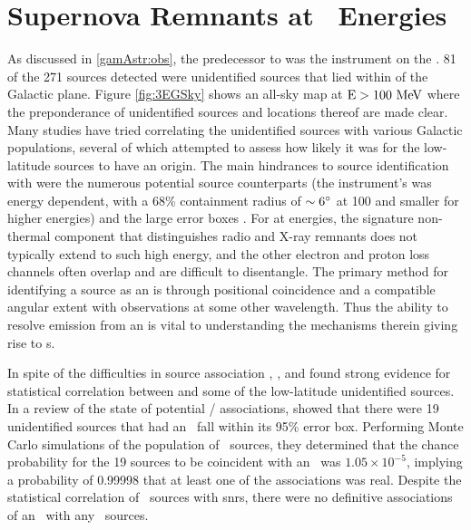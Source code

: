\section{\label{Rems:latGam}Supernova Remnants at \gam~Energies}
As discussed in \ref{gamAstr:obs}, the predecessor to \FermiLat{} was the \egret{} instrument on the \cgro{}. 81 of the 271 \egret{} sources detected were unidentified sources that lied within \blat {} of the Galactic plane.  Figure \ref{fig:3EGSky} shows an \egret{} all-sky map at ${\rm E > 100 ~\mathrm{MeV}}$ where the preponderance of unidentified sources and locations thereof are made clear. Many studies have tried correlating the unidentified \egret{} sources with various Galactic populations, several of which attempted to assess how likely it was for the low-latitude sources to have an \snr{} origin. The main hindrances to source identification with \egret{} were the numerous potential source counterparts (the instrument's \psf{} was energy dependent, with a 68\% containment radius of ${\rm \sim 6 ^\circ}$ at 100\mev{} and smaller for higher energies) and the large \egret{} error boxes \citep{Hartman99}. For \snrs{} at \gam{} energies, the signature non-thermal \sync{} component that distinguishes radio and X-ray remnants does not typically extend to such high energy, and the other electron and proton loss channels often overlap and are difficult to disentangle. The primary method for identifying a \gam{} source as an \snr{} is through positional coincidence and a compatible angular extent with observations at some other wavelength. Thus the ability to resolve emission from an \snr{} is vital to understanding the mechanisms therein giving rise to \gam{}s.

In spite of the difficulties in \egret{} source association \cite{Sturner95}, \cite{Esposito96}, and \cite{Romero99} found strong evidence for statistical correlation between \snrs{} and some of the low-latitude unidentified sources. In a review of the state of potential \snr{} /  \egret{} associations, \cite{Torres03} showed that there were 19 unidentified \egret{} sources that had an \snr~fall within its 95\% error box. Performing Monte Carlo simulations of the population of  \egret~sources, they determined that the chance probability for the 19 sources to be coincident with an \snr~was $1.05 \times 10^{-5}$, implying a probability of 0.99998 that at least one of the associations was real. Despite the statistical correlation of \egret~sources with \glspl{snr}, there were no definitive associations of an \snr~with any \egret~sources.

